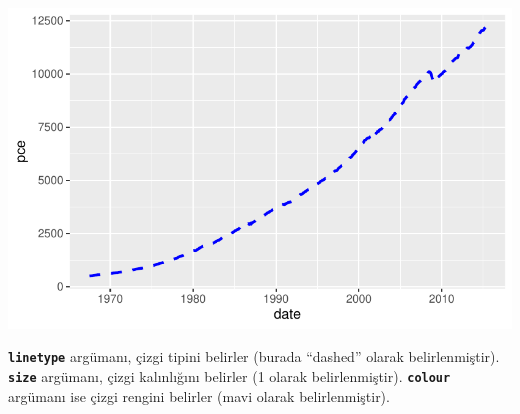\documentclass[
  letterpaper,
  DIV=11,
  numbers=noendperiod]{scrreprt}
\begin{document}
\includegraphics{ggplot2_files/figure-pdf/unnamed-chunk-23-1.pdf}

\textbf{\texttt{linetype}} argümanı, çizgi tipini belirler (burada
``dashed'' olarak belirlenmiştir). \textbf{\texttt{size}} argümanı,
çizgi kalınlığını belirler (1 olarak belirlenmiştir).
\textbf{\texttt{colour}} argümanı ise çizgi rengini belirler (mavi
olarak belirlenmiştir).
\end{document}
